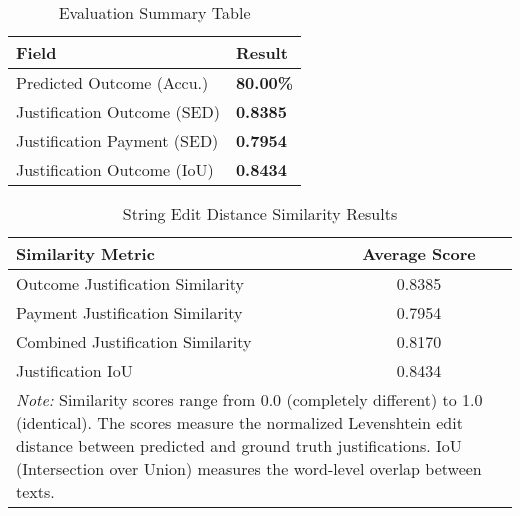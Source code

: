 
\begin{table}[H]
\centering
\caption{Evaluation Summary Table}
\label{tab:evaluation_summary}
\begin{tabular}{@{}lp{2cm}@{}}
\toprule
\textbf{Field} & \textbf{Result} \\
\midrule
Predicted Outcome (Accu.) & \textbf{80.00\%} \\
Justification Outcome (SED) &  \textbf{0.8385} \\
Justification Payment (SED) &  \textbf{0.7954} \\
Justification Outcome (IoU) &  \textbf{0.8434} \\
\bottomrule
\end{tabular}
\end{table}

\begin{table}[H]
\centering
\caption{String Edit Distance Similarity Results}
\label{tab:string_edit_distance_results}
\begin{tabular}{lc}
\toprule
\textbf{Similarity Metric} & \textbf{Average Score} \\
\midrule
Outcome Justification Similarity & 0.8385 \\
Payment Justification Similarity & 0.7954 \\
Combined Justification Similarity & 0.8170 \\
Justification IoU & 0.8434 \\
\midrule
\multicolumn{2}{p{13cm}}{\textit{Note:} Similarity scores range from 0.0 (completely different) to 1.0 (identical). 
The scores measure the normalized Levenshtein edit distance between predicted and ground truth justifications.
IoU (Intersection over Union) measures the word-level overlap between texts.} \\
\bottomrule
\end{tabular}
\end{table}

